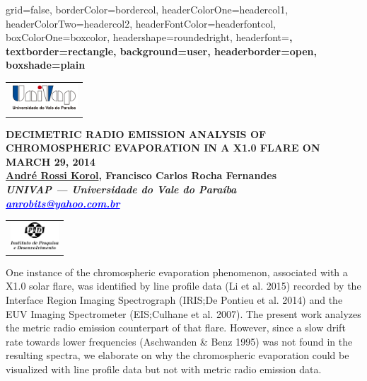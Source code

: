\documentclass[a0paper,portrait]{baposter}
\begin{document}
\begin{poster}
{grid=false,
borderColor=bordercol, %
headerColorOne=headercol1, %
headerColorTwo=headercol2, %
headerFontColor=headerfontcol, %
boxColorOne=boxcolor, %
headershape=roundedright, %
headerfont=\Large\sf\bf, %
textborder=rectangle,
background=user,
headerborder=open, %
boxshade=plain
}
{\begin{tabular}{c}
        \includegraphics[height=1cm]{UNIVAP-SF.png}\\
\end{tabular}
}
%
%
{\bf  \LARGE {DECIMETRIC RADIO EMISSION ANALYSIS OF CHROMOSPHERIC EVAPORATION IN A X1.0 FLARE ON MARCH 29, 2014} \\ %
\vspace{0.2cm}
\footnotesize \underline{André Rossi Korol}, Francisco Carlos Rocha Fernandes\\  %
\footnotesize \it UNIVAP --- Universidade do Vale do Paraíba\\ %
\footnotesize \it \textcolor{blue}{\underline{anrobits@yahoo.com.br}}\/}

{\begin{tabular}{c}
        \includegraphics[height=1cm]{ipd2-sf.png}
\end{tabular}
}

{One instance of the chromospheric evaporation phenomenon, associated with a X1.0
    solar flare, was identified by line profile data (Li et al. 2015) recorded by
    the Interface Region Imaging Spectrograph (IRIS;\@ De Pontieu et al. 2014) and
    the EUV Imaging Spectrometer (EIS;\@ Culhane et al. 2007). The present work analyzes
    the metric radio emission counterpart of that flare. However, since a slow drift
    rate towards lower frequencies (Aschwanden \& Benz 1995) was not found in the
    resulting spectra, we elaborate on why the chromospheric evaporation could be
    visualized with line profile data but not with metric radio emission data.

}
\end{poster}
\end{document}
